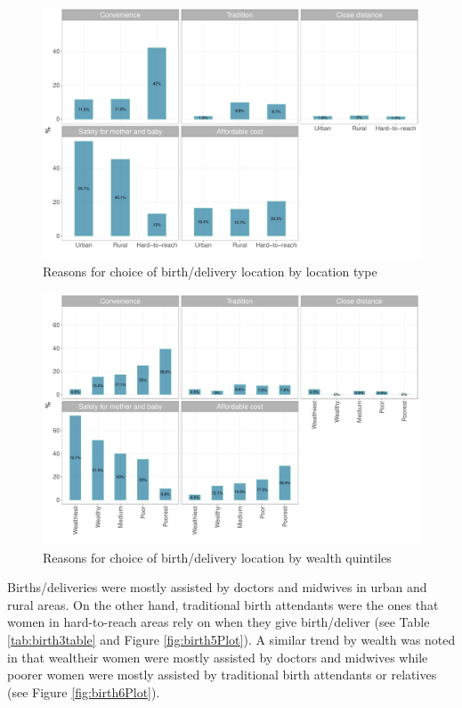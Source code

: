\documentclass[12pt,a4paper]{article}
\begin{document}
\begin{figure}[H]

{\centering \includegraphics{kayinReport_files/figure-latex/birth3Plot-1} 

}

\caption{Reasons for choice of birth/delivery location by location type}\label{fig:birth3Plot}
\end{figure}

\begin{figure}[H]

{\centering \includegraphics{kayinReport_files/figure-latex/birth4Plot-1} 

}

\caption{Reasons for choice of birth/delivery location by wealth quintiles}\label{fig:birth4Plot}
\end{figure}

Births/deliveries were mostly assisted by doctors and midwives in urban and rural areas. On the other hand, traditional birth attendants were the ones that women in hard-to-reach areas rely on when they give birth/deliver (see Table \ref{tab:birth3table} and Figure \ref{fig:birth5Plot}). A similar trend by wealth was noted in that wealtheir women were mostly assisted by doctors and midwives while poorer women were mostly assisted by traditional birth attendants or relatives (see Figure \ref{fig:birth6Plot}).
\end{document}

